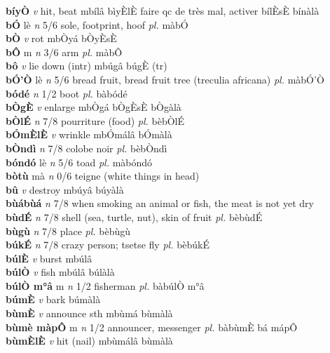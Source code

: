 \documentclass{article}
\begin{document}
{\bf bíyÒ}  {\it v} hit, beat   mbílâ bìyÈlÈ faire qc de très mal, activer bílÈsÈ bínàlà   \\ 
{\bf bÓ} lè {\it n} 5/6 sole, footprint, hoof {\it pl.} màbÓ         \\ 
{\bf bÒ}  {\it v} rot   mbÒyá  bÒyÈsÈ    \\ 
{\bf bÔ} m {\it n} 3/6 arm {\it pl.} màbÔ         \\ 
{\bf bô}  {\it v} lie down (intr)   mbúgâ     búgÈ (tr) \\ 
{\bf bÓ'Ò} lè {\it n} 5/6 bread fruit, bread fruit tree (treculia africana) {\it pl.} màbÓ'Ò         \\ 
{\bf bódé}  {\it n} 1/2 boot {\it pl.} bàbódé         \\ 
{\bf bÒgÈ}  {\it v} enlarge   mbÒgá  bÒgÈsÈ bÒgàlà   \\ 
{\bf bÒlÉ}  {\it n} 7/8 pourriture (food) {\it pl.} bèbÒlÉ         \\ 
{\bf bÓmÈlÈ}  {\it v} wrinkle    mbÓmálâ   bÓmàlà   \\ 
{\bf bÒndì}  {\it n} 7/8 colobe noir {\it pl.} bèbÒndì         \\ 
{\bf bóndó} lè {\it n} 5/6 toad {\it pl.} màbóndó         \\ 
{\bf bòtù} mà {\it n} 0/6 teigne (white things in head)         \\ 
{\bf bû}  {\it v} destroy   mbúyâ   búyàlà   \\ 
{\bf bùábùá}  {\it n} 7/8 when smoking an animal or fish, the meat is not yet dry         \\ 
{\bf bùdÉ}  {\it n} 7/8 shell (sea, turtle, nut), skin of fruit {\it pl.} bèbùdÉ         \\ 
{\bf bùgù}  {\it n} 7/8 place {\it pl.} bèbùgù         \\ 
{\bf búkÉ}  {\it n} 7/8 crazy person; tsetse fly {\it pl.} bèbúkÉ         \\ 
{\bf búlÈ}  {\it v} burst   mbúlâ      \\ 
{\bf búlÒ}  {\it v} fish   mbúlâ   búlàlà   \\ 
{\bf búlÒ m°â} m {\it n} 1/2 fisherman {\it pl.} bàbúlÒ m°â         \\ 
{\bf búmÈ}  {\it v} bark      búmàlà   \\ 
{\bf bùmÈ}  {\it v} announce sth   mbùmá   bùmàlà   \\ 
{\bf bùmè màpÔ} m {\it n} 1/2 announcer, messenger {\it pl.} bàbùmÈ bá mápÔ         \\ 
{\bf bùmÈlÈ}  {\it v} hit (nail)   mbùmálâ   bùmàlà   \\ 
\end{document}
